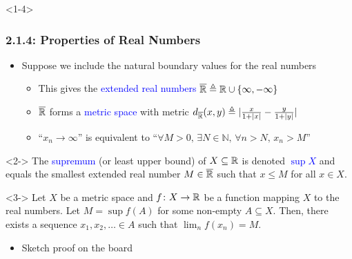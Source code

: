 \documentclass[10pt,english,aspectratio=169]{beamer}
\begin{document}
\begin{frame}<1-4>
\frametitle{2.1.4: Properties of Real Numbers}

\begin{itemize}
\setlength\itemsep{3mm}
\item<1-> Suppose we include the natural boundary values for the real numbers \vspace{1mm}

\begin{itemize} 
  \setlength\itemsep{1.5mm}
  \item This gives the \textcolor{blue}{extended real numbers} $\overline{\mathbb{R}} \triangleq \mathbb{R} \cup \{ \infty,-\infty\}$
  \item $\overline{\mathbb{R}}$ forms a \textcolor{blue}{metric space} with metric $d_{\overline{\mathbb{R}}} (x,y) \triangleq |\frac{x}{1+|x|} - \frac{y}{1+|y|}|$
  \item ``$x_n \to \infty$'' is equivalent to ``$\forall M>0, \, \exists N\in \mathbb{N}, \, \forall n>N, \, x_n > M$''
\end{itemize}
\end{itemize}

\begin{definition}<2->
The \textcolor{blue}{supremum} (or least upper bound) of $X\subseteq \mathbb{R}$ is denoted \textcolor{blue}{$\sup X$} and equals the smallest extended real number $M \in \overline{\mathbb{R}}$ such that $x\leq M$ for all $x\in X$.
\end{definition}

\begin{lemma}<3->
Let $X$ be a metric space and $f \colon X\rightarrow \mathbb{R}$ be a function mapping $X$ to the real numbers.
Let $M = \sup f(A)$ for some non-empty $A \subseteq X$.
Then, there exists a sequence $x_1,x_2,\ldots \in A$ such that $\lim_n f(x_n) = M$.
\end{lemma}

\begin{itemize}
\item<4-> Sketch proof on the board
\end{itemize}


\end{frame}
\end{document}
